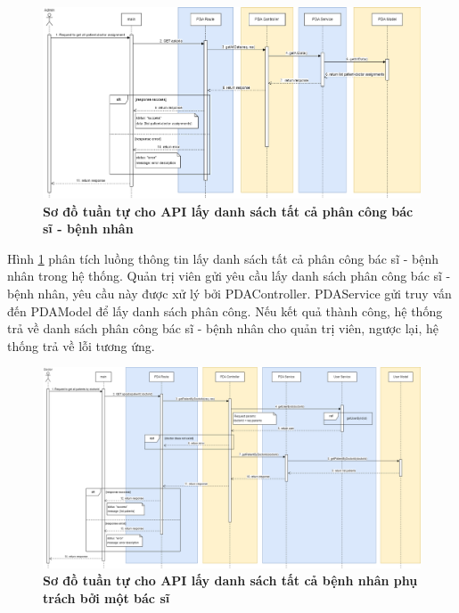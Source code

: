 \begin{figure}[H]
  \centering
  \includegraphics[scale=0.35]{Images/sequence_api/getAllPDA.png}
  \caption[Sơ đồ tuần tự cho API lấy danh sách tất cả phân công bác sĩ - bệnh nhân ]{\bfseries \fontsize{12pt}{0pt}
  \selectfont Sơ đồ tuần tự cho API lấy danh sách tất cả phân công bác sĩ - bệnh nhân }
  \label{api_getAllPDA} %
\end{figure}
Hình \ref{api_getAllPDA} phân tích luồng thông tin lấy danh sách tất cả phân công bác sĩ - bệnh nhân trong hệ thống. Quản trị viên gửi yêu cầu lấy danh sách phân công bác sĩ - bệnh nhân, 
yêu cầu này được xử lý bởi PDAController. PDAService gửi truy vấn đến PDAModel để lấy danh sách phân công. Nếu kết quả thành công, hệ thống trả về danh sách phân công bác sĩ - bệnh nhân cho quản trị viên, ngược lại, hệ thống trả về lỗi tương ứng.
\begin{figure}[H]
  \centering
  \includegraphics[scale=0.3]{Images/sequence_api/getPatientByDoctorId.png}
  \caption[Sơ đồ tuần tự cho API lấy danh sách tất cả bệnh nhân phụ trách bởi một bác sĩ ]{\bfseries \fontsize{12pt}{0pt}
  \selectfont Sơ đồ tuần tự cho API lấy danh sách tất cả bệnh nhân phụ trách bởi một bác sĩ }
  \label{api_getPatient} %
\end{figure}

